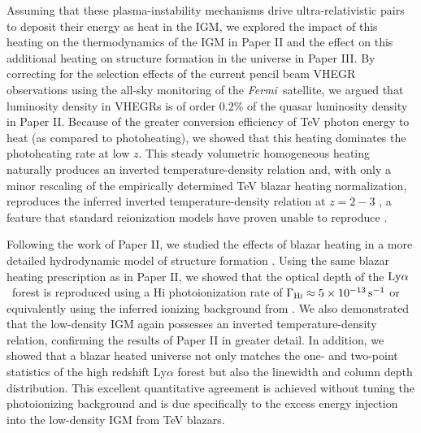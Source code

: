 \documentclass[usenatbib,iop,apj,numberedappendix]{aeb_emulateapj_2010}
\newcommand{\mathsc}[1]{\text{\textsc{#1}}}
\newcommand{\Lya}{\ensuremath{{\rm Ly}\alpha}}
\def\Fermi{{\em Fermi\ }}
\begin{document}
Assuming that these plasma-instability mechanisms drive ultra-relativistic pairs to deposit their energy as heat in
the IGM, we explored the impact of this heating on the
thermodynamics of the IGM in Paper II and the effect on this additional heating on structure formation in the universe in Paper III.  
By correcting for the selection effects of the current pencil beam VHEGR observations using
the all-sky monitoring of the \Fermi satellite, we argued that 
luminosity density in VHEGRs is of order $0.2\%$ of the quasar
luminosity density in Paper II.  Because of the greater conversion efficiency of TeV photon energy to heat (as compared to photoheating), we showed that this heating dominates the
photoheating rate at low $z$. This steady volumetric homogeneous heating naturally produces an inverted temperature-density relation and, with only a minor rescaling of the empirically determined TeV blazar
heating normalization, reproduces the inferred
inverted temperature-density relation at $z=2-3$ \citep{Bolton+09,Viel+09}, a feature that standard reionization models have proven unable to reproduce \citep{McQuinn+09,Bolton+09}.

Following the work of Paper II, we studied the effects of blazar heating in a
more detailed hydrodynamic model of structure formation 
\citep{Puchwein+2011}. Using the same blazar heating prescription as in Paper
II, we showed that the optical depth of the \Lya\ forest is reproduced using a
H{\sc i} photoionization rate of $\Gamma_{\rm H\mathsc{i}} \approx 5\times
10^{-13}\,{\rm s}^{-1}$ or equivalently using the inferred ionizing background
from \citet{FG+09}.  We also demonstrated that the low-density IGM again
possesses an inverted temperature-density relation, confirming the results of
Paper II in greater detail.  In addition, we showed that a blazar heated
universe not only matches the one- and two-point statistics of the
  high redshift Ly$\alpha$ forest but also the linewidth and column depth
  distribution. This excellent quantitative agreement is achieved
without tuning the photoionizing background and is due specifically to the
excess energy injection into the low-density IGM from TeV blazars.
\end{document}
